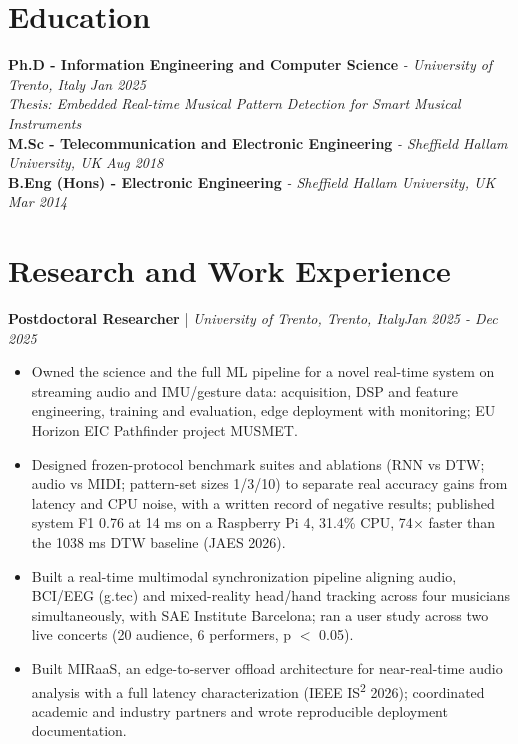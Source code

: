 \documentclass[11pt]{article}
\newenvironment{cvrole}[5]{%
  \par\noindent\textbf{\large #1} | \textit{\small #2, #3}\hfill \textit{\small #4 - #5}\par
  \begin{itemize}[leftmargin=2em, itemsep=-0.3em, topsep=-0.5em]%
}{%
  \end{itemize}\par\noindent\mbox{}\par\vspace{0.1em}%
}
\begin{document}
\section*{Education}
\textbf{Ph.D - Information Engineering and Computer Science} \textit{\small{ - University of Trento, Italy}} \hfill \textit{Jan 2025}\\[2pt]
\noindent\textit{\small Thesis: Embedded Real-time Musical Pattern Detection for Smart Musical Instruments}\\[3pt]
\noindent\textbf{M.Sc - Telecommunication and Electronic Engineering} \textit{\small{ - Sheffield Hallam University, UK}} \hfill \textit{Aug 2018}\\[3pt]
\noindent\textbf{B.Eng (Hons) - Electronic Engineering} \textit{\small{ - Sheffield Hallam University, UK}} \hfill \textit{Mar 2014}

\section*{Research and Work Experience}

\begin{cvrole}{Postdoctoral Researcher}{University of Trento}{Trento, Italy}{Jan 2025}{Dec 2025}
    \item Owned the science and the full ML pipeline for a novel real-time system on streaming audio and IMU/gesture data: acquisition, DSP and feature engineering, training and evaluation, edge deployment with monitoring; EU Horizon EIC Pathfinder project MUSMET.
    \item Designed frozen-protocol benchmark suites and ablations (RNN vs DTW; audio vs MIDI; pattern-set sizes 1/3/10) to separate real accuracy gains from latency and CPU noise, with a written record of negative results; published system F1 0.76 at 14 ms on a Raspberry Pi 4, 31.4\% CPU, 74$\times$ faster than the 1038 ms DTW baseline (JAES 2026).
    \item Built a real-time multimodal synchronization pipeline aligning audio, BCI/EEG (g.tec) and mixed-reality head/hand tracking across four musicians simultaneously, with SAE Institute Barcelona; ran a user study across two live concerts (20 audience, 6 performers, p $<$ 0.05).
    \item Built MIRaaS, an edge-to-server offload architecture for near-real-time audio analysis with a full latency characterization (IEEE IS\textsuperscript{2} 2026); coordinated academic and industry partners and wrote reproducible deployment documentation.
\end{cvrole}
\end{document}

